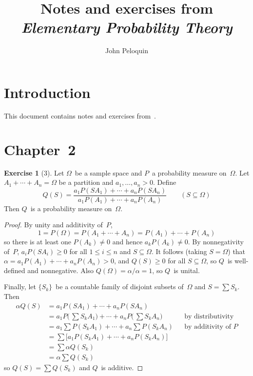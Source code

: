 \documentclass[letterpaper,12pt]{article}
\title{Notes and exercises from\\\textit{Elementary Probability Theory}}
\author{John Peloquin}
\date{}
\theoremstyle{definition}
\newtheorem*{exer}{Exercise}
\theoremstyle{remark}
\begin{document}
\maketitle

\section*{Introduction}
This document contains notes and exercises from~\cite{chung}.

\section*{Chapter~2}
\begin{exer}[3]
Let \(\Omega\)~be a sample space and \(P\)~a probability measure on~\(\Omega\). Let \(A_1+\cdots+A_n=\Omega\) be a partition and \(a_1,\ldots,a_n>0\). Define
\[Q(S)=\frac{a_1P(SA_1)+\cdots+a_nP(SA_n)}{a_1P(A_1)+\cdots+a_nP(A_n)}\qquad(S\subseteq\Omega)\]
Then \(Q\)~is a probability measure on~\(\Omega\).
\end{exer}
\begin{proof}
By unity and additivity of~\(P\),
\[1=P(\Omega)=P(A_1+\cdots+A_n)=P(A_1)+\cdots+P(A_n)\]
so there is at least one \(P(A_k)\ne0\) and hence \(a_kP(A_k)\ne0\). By nonnegativity of~\(P\), \(a_iP(SA_i)\ge0\) for all \(1\le i\le n\) and \(S\subseteq\Omega\). It follows (taking \(S=\Omega\)) that \(\alpha=a_1P(A_1)+\cdots+a_nP(A_n)>0\), and \(Q(S)\ge0\) for all \(S\subseteq\Omega\), so \(Q\)~is well-defined and nonnegative. Also \(Q(\Omega)=\alpha/\alpha=1\), so \(Q\)~is unital.

Finally, let \(\{S_k\}\)~be a countable family of disjoint subsets of~\(\Omega\) and \(S=\sum S_k\). Then
\begin{align*}
\alpha Q(S)&=a_1P(SA_1)+\cdots+a_nP(SA_n)&&\\
	&=a_1P\bigl(\,\sum S_kA_1\bigr)+\cdots+a_nP\bigl(\,\sum S_kA_n\bigr)&&\text{by distributivity}\\
	&=a_1\sum P(S_kA_1)+\cdots+a_n\sum P(S_kA_n)&&\text{by additivity of~\(P\)}\\
	&=\sum\bigl[a_1P(S_kA_1)+\cdots+a_nP(S_kA_n)\bigr]&&\\
	&=\sum\alpha Q(S_k)&&\\
	&=\alpha\sum Q(S_k)
\end{align*}
so \(Q(S)=\sum Q(S_k)\) and \(Q\)~is additive.
\end{proof}
\end{document}
